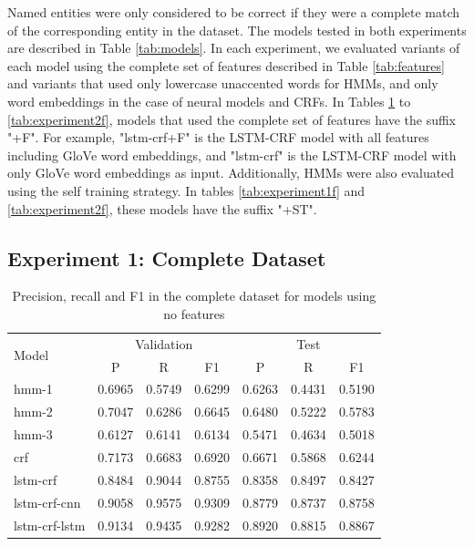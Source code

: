 \documentclass{nle}
\begin{document}
Named entities were only considered to be correct if they were a complete match of the 
corresponding entity in the dataset. The models tested in both experiments are described in Table \ref{tab:models}.
In each experiment, we evaluated variants of each model using the complete set of features described in 
Table \ref{tab:features} and variants that used only lowercase unaccented words for HMMs, 
and only word embeddings in the case of neural models and CRFs. In Tables \ref{tab:experiment1} to 
\ref{tab:experiment2f}, models that used the complete set of features have the suffix "+F". For example,
"lstm-crf+F" is the LSTM-CRF model with all features including GloVe word embeddings, and "lstm-crf" is 
the LSTM-CRF model with only GloVe word embeddings as input.
Additionally, HMMs were also evaluated using the self training strategy. In tables \ref{tab:experiment1f} 
and \ref{tab:experiment2f}, these models have the suffix "+ST".

\subsection{Experiment 1: Complete Dataset}

\begin{table}[h]
  \small
  \begin{center}
    \begin{tabular}{ lllllll }
      \toprule
      \multirow{2}{*}{Model} & \multicolumn{3}{c}{Validation} & \multicolumn{3}{c}{Test} \\
                             & \multicolumn{1}{c}{P} & \multicolumn{1}{c}{R} & \multicolumn{1}{c}{F1}
                             & \multicolumn{1}{c}{P} & \multicolumn{1}{c}{R} & \multicolumn{1}{c}{F1} \\
      \midrule
      hmm-1	    & 0.6965 & 0.5749 & 0.6299 & 0.6263 & 0.4431 & 0.5190 \\
      hmm-2	    & 0.7047 & 0.6286 & 0.6645 & 0.6480 & 0.5222 & 0.5783 \\
      hmm-3	    & 0.6127 & 0.6141 & 0.6134 & 0.5471 & 0.4634 & 0.5018 \\
      crf	    & 0.7173 & 0.6683 & 0.6920 & 0.6671 & 0.5868 & 0.6244 \\
      lstm-crf	    & 0.8484 & 0.9044 & 0.8755 & 0.8358 & 0.8497 & 0.8427 \\
      lstm-crf-cnn  & 0.9058 & 0.9575 & 0.9309 & 0.8779 & 0.8737 & 0.8758 \\
      lstm-crf-lstm & 0.9134 & 0.9435 & 0.9282 & 0.8920 & 0.8815 & 0.8867 \\
      \bottomrule
    \end{tabular}
  \end{center}
  \caption{Precision, recall and F1 in the complete dataset for models using no features}
  \label{tab:experiment1}
\end{table}
\end{document}
